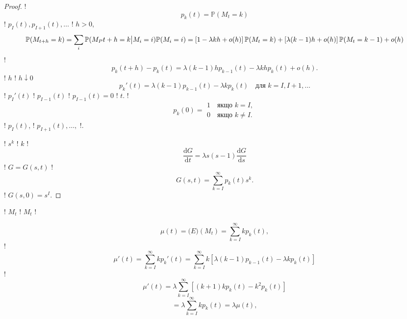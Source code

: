 \documentclass[12pt,fleqn]{article}
\numberwithin{figure}{section}
\numberwithin{equation}{section}
\begin{document}
\begin{proof}
  !
  $$p_k(t)=\mathbb{P}(M_t=k)$$
  ! $p_I(t),p_{I+1}(t), \dots$ ! $h>0$,
  \[\mathbb{P}(M_{t+h}=k)=\sum_{i}\mathbb{P}(M_P{t+h}=k\big|M_i=i)\mathbb{P}(M_i=i)
    \\=\left[1-\lambda kh +o(h)\right]\mathbb{P}(M_t=k)+\left[\lambda(k-1)h+o(h)\right]\mathbb{P}(M_t=k-1)+o(h)\]
  !
  \[p_k(t+h)-p_k(t)=\lambda(k-1)hp_{k-1}(t)-\lambda khp_k(t) + o(h). \]
  ! $h$ ! $h\downarrow0$
  \[p_{k}'(t)=\lambda(k-1)p_{k-1}(t)-\lambda kp_k(t) \quad \text{для } k=I, I+1, \dots\]
  ! $p_{I}'(t)$ ! $p_{I-1}(t)$ ! $p_{I-1}(t)=0$ ! $t$. !
  \begin{equation}\label{11.39}
  p_{k}(0)=\begin{matrix}
             1 \quad \text{якщо } k=I, \\
             0 \quad \text{якщо } k\neq I.
           \end{matrix}
  \end{equation}
  ! $p_{I}(t)$, ! $p_{I+1}(t), \dots,$ !.
  
  ! $s^k$ ! $k$ !
  \begin{equation}\label{11.40}
    \frac{\mathrm{d}G}{\mathrm{d}t}=\lambda s(s-1)\frac{\mathrm{d}G}{\mathrm{d}s}
  \end{equation}
  ! $G=G(s, t)$ !
  $$G(s,t)=\sum_{k=I}^{\infty}p_k(t)s^k.$$
  ! $G(s,0)=s^I$.
\end{proof}

! $M_t$ ! $M_t$ !

$$\mu(t)=\mathbb(E)(M_t)=\sum_{k=I}^{\infty}kp_k(t),$$
!
\begin{equation}\label{11.41}
  \mu'(t)=\sum_{k=I}^{\infty}kp_k'(t)=\sum_{k=I}^{\infty}k\left[\lambda(k-1)p_{k-1}(t)-\lambda k p_k(t) \right]
\end{equation}
!
\begin{equation}\label{11.42}
  \mu'(t)=\lambda\sum_{k=I}^{\infty}\left[(k+1)kp_{k}(t)-k^2p_k(t) \right]
\end{equation}
\begin{equation}\label{11.43}
  = \lambda \sum_{k=I}^{\infty} kp_k(t)=\lambda\mu(t),
\end{equation}
\end{document}
